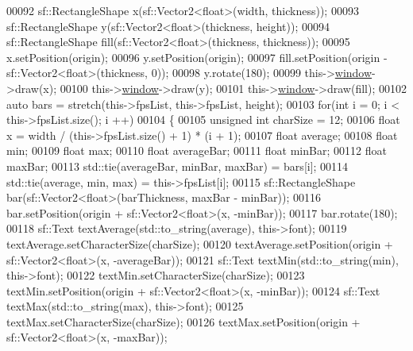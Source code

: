\begin{DoxyCode}
00092             sf::RectangleShape x(sf::Vector2<float>(width, thickness));
00093             sf::RectangleShape y(sf::Vector2<float>(thickness, height));
00094             sf::RectangleShape fill(sf::Vector2<float>(thickness, thickness));
00095             x.setPosition(origin);
00096             y.setPosition(origin);
00097             fill.setPosition(origin - sf::Vector2<float>(thickness, 0));
00098             y.rotate(180);
00099             this->\hyperlink{classdsf_1_1sfml_1_1_render_window_a2c04b61ca1bfba140120001c4a9a30e1}{window}->draw(x);
00100             this->\hyperlink{classdsf_1_1sfml_1_1_render_window_a2c04b61ca1bfba140120001c4a9a30e1}{window}->draw(y);
00101             this->\hyperlink{classdsf_1_1sfml_1_1_render_window_a2c04b61ca1bfba140120001c4a9a30e1}{window}->draw(fill);
00102             \textcolor{keyword}{auto} bars = stretch(this->fpsList, this->fpsList, height);
00103             \textcolor{keywordflow}{for}(\textcolor{keywordtype}{int} i = 0; i < this->fpsList.size(); i ++)
00104             \{
00105                 \textcolor{keywordtype}{unsigned} \textcolor{keywordtype}{int} charSize = 12;
00106                 \textcolor{keywordtype}{float} x = width / (this->fpsList.size() + 1) * (i + 1);
00107                 \textcolor{keywordtype}{float} average;
00108                 \textcolor{keywordtype}{float} min;
00109                 \textcolor{keywordtype}{float} max;
00110                 \textcolor{keywordtype}{float} averageBar;
00111                 \textcolor{keywordtype}{float} minBar;
00112                 \textcolor{keywordtype}{float} maxBar;
00113                 std::tie(averageBar, minBar, maxBar) = bars[i];
00114                 std::tie(average, min, max) = this->fpsList[i];
00115                 sf::RectangleShape bar(sf::Vector2<float>(barThickness, maxBar - minBar));
00116                 bar.setPosition(origin + sf::Vector2<float>(x, -minBar));
00117                 bar.rotate(180);
00118                 sf::Text textAverage(std::to\_string(average), this->font);
00119                 textAverage.setCharacterSize(charSize);
00120                 textAverage.setPosition(origin + sf::Vector2<float>(x, -averageBar));
00121                 sf::Text textMin(std::to\_string(min), this->font);
00122                 textMin.setCharacterSize(charSize);
00123                 textMin.setPosition(origin + sf::Vector2<float>(x, -minBar));
00124                 sf::Text textMax(std::to\_string(max), this->font);
00125                 textMax.setCharacterSize(charSize);
00126                 textMax.setPosition(origin + sf::Vector2<float>(x, -maxBar));

\end{DoxyCode}
